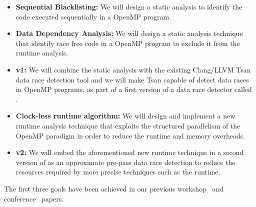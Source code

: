 \begin{itemize}
\item \textbf{Sequential Blacklisting:} We will design a static analysis to
  identify the code executed sequentially in a OpenMP program.
\item \textbf{Data Dependency Analysis:} We will design a static analysis
  technique that identify race free code in a OpenMP program to exclude it
  from the runtime analysis.
\item \textbf{\archer v1:} We will combine the static analysis with the
  existing Clang/LLVM Tsan data race detection tool and we will make Tsan
  capable of detect data races in OpenMP programs, as part of a first version
  of a data race detector called \archer.
\item \textbf{Clock-less runtime algorithm:} We will design and implement a
  new runtime analysis technique that exploits the structured parallelism of
  the OpenMP paradigm in order to reduce the runtime and memory overheads.
\item \textbf{\archer v2:} We will embed the aforementioned new runtime
  technique in a second version of \archer as an approximate pre-pass data
  race detection to reduce the resources required by more precise techniques
  such as the \tsan runtime.
\end{itemize}

The first three goals have been achieved in our previous
workshop~\cite{Protze:2014:TPL:2688361.2688369} and
conference~\cite{atzeni2016} papers.

